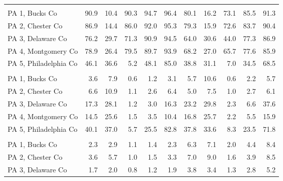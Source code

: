 \begin{longtable}[l]{l|rrrrrrrrrr}
\endfoot
\bottomrule
\endlastfoot
\addlinespace[0.5em]
\multicolumn{11}{l}{\textbf{\% White, non-Hispanic}}\\
\hspace{1em}PA 1, Bucks Co & 90.9 & 10.4 & 90.3 & 94.7 & 96.4 & 80.1 & 16.2 & 73.1 & 85.5 & 91.3\\
\hspace{1em}PA 2, Chester Co & 86.9 & 14.4 & 86.0 & 92.0 & 95.3 & 79.3 & 15.9 & 72.6 & 83.7 & 90.4\\
\hspace{1em}PA 3, Delaware Co & 76.2 & 29.7 & 71.3 & 90.9 & 94.5 & 64.0 & 30.6 & 44.0 & 77.3 & 86.9\\
\hspace{1em}PA 4, Montgomery Co & 78.9 & 26.4 & 79.5 & 89.7 & 93.9 & 68.2 & 27.0 & 65.7 & 77.6 & 85.9\\
\hspace{1em}PA 5, Philadelphia Co & 46.1 & 36.6 & 5.2 & 48.1 & 85.0 & 38.8 & 31.1 & 7.0 & 34.5 & 68.5\\
\addlinespace[0.5em]
\multicolumn{11}{l}{\textbf{\% Black, non-Hispanic}}\\
\hspace{1em}PA 1, Bucks Co & 3.6 & 7.9 & 0.6 & 1.2 & 3.1 & 5.7 & 10.6 & 0.6 & 2.2 & 5.7\\
\hspace{1em}PA 2, Chester Co & 6.6 & 10.9 & 1.1 & 2.6 & 6.4 & 5.0 & 7.5 & 1.0 & 2.7 & 6.1\\
\hspace{1em}PA 3, Delaware Co & 17.3 & 28.1 & 1.2 & 3.0 & 16.3 & 23.2 & 29.8 & 2.3 & 6.6 & 37.6\\
\hspace{1em}PA 4, Montgomery Co & 14.5 & 25.6 & 1.5 & 3.5 & 10.4 & 16.8 & 25.7 & 2.2 & 5.5 & 15.9\\
\hspace{1em}PA 5, Philadelphia Co & 40.1 & 37.0 & 5.7 & 25.5 & 82.8 & 37.8 & 33.6 & 8.3 & 23.5 & 71.8\\
\addlinespace[0.5em]
\multicolumn{11}{l}{\textbf{\% Hispanic}}\\
\hspace{1em}PA 1, Bucks Co & 2.3 & 2.9 & 1.1 & 1.4 & 2.3 & 6.3 & 7.1 & 2.0 & 4.4 & 8.4\\
\hspace{1em}PA 2, Chester Co & 3.6 & 5.7 & 1.0 & 1.5 & 3.3 & 7.0 & 9.0 & 1.6 & 3.9 & 8.5\\
\hspace{1em}PA 3, Delaware Co & 1.7 & 2.0 & 0.8 & 1.2 & 1.9 & 3.8 & 3.4 & 1.3 & 2.8 & 5.2\\

\end{longtable}
